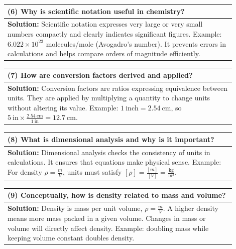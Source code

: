 \documentclass{article}
\begin{document}
\begin{tabular}{|p{0.9\linewidth}|}
\hline
\textbf{(6) Why is scientific notation useful in chemistry?} \\ \hline
\textbf{Solution:} Scientific notation expresses very large or very small numbers compactly and clearly indicates significant figures. Example: $6.022 \times 10^{23}$ molecules/mole (Avogadro’s number). It prevents errors in calculations and helps compare orders of magnitude efficiently. \\ \hline
\end{tabular}
\newpage

\begin{tabular}{|p{0.9\linewidth}|}
\hline
\textbf{(7) How are conversion factors derived and applied?} \\ \hline
\textbf{Solution:} Conversion factors are ratios expressing equivalence between units. They are applied by multiplying a quantity to change units without altering its value. Example: $1~\text{inch} = 2.54~\text{cm}$, so $5~\text{in} \times \frac{2.54~\text{cm}}{1~\text{in}} = 12.7~\text{cm}$. \\ \hline
\end{tabular}
\newpage

\begin{tabular}{|p{0.9\linewidth}|}
\hline
\textbf{(8) What is dimensional analysis and why is it important?} \\ \hline
\textbf{Solution:} Dimensional analysis checks the consistency of units in calculations. It ensures that equations make physical sense. Example: For density $\rho = \frac{m}{V}$, units must satisfy $[\rho] = \frac{[m]}{[V]} = \frac{\text{kg}}{\text{m}^3}$. \\ \hline
\end{tabular}
\newpage

\begin{tabular}{|p{0.9\linewidth}|}
\hline
\textbf{(9) Conceptually, how is density related to mass and volume?} \\ \hline
\textbf{Solution:} Density is mass per unit volume, $\rho = \frac{m}{V}$. A higher density means more mass packed in a given volume. Changes in mass or volume will directly affect density. Example: doubling mass while keeping volume constant doubles density. \\ \hline
\end{tabular}
\newpage
\end{document}
